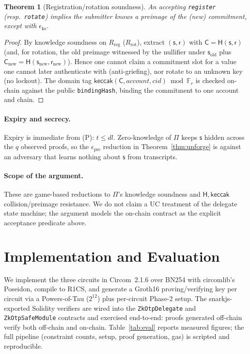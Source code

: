 \documentclass[11pt]{article}
\theoremstyle{definition}
\theoremstyle{plain}
\newtheorem{theorem}{Theorem}
\newcommand{\Hash}{\mathsf{H}}       %
\newcommand{\keccak}{\mathsf{keccak}}
\newcommand{\Fr}{\mathbb{F}_r}       %
\newcommand{\secret}{\mathsf{s}}
\newcommand{\salt}{\mathsf{r}}
\newcommand{\commit}{\mathsf{C}}
\begin{document}
\begin{theorem}[Registration/rotation soundness]
\label{thm:reg}
An accepting \texttt{register} (resp.\ \texttt{rotate}) implies the submitter knows a
preimage of the (new) commitment, except with $\epsilon_{\mathrm{ks}}$.
\end{theorem}
\begin{proof}
By knowledge soundness on $R_{\mathrm{reg}}$ ($R_{\mathrm{rot}}$), extract
$(\secret,\salt)$ with $\commit=\Hash(\secret,\salt)$ (and, for rotation, the old
preimage witnessed by the nullifier under $\secret_{\mathrm{old}}$ plus
$\commit_{\mathrm{new}}=\Hash(\secret_{\mathrm{new}},\salt_{\mathrm{new}})$). Hence one
cannot claim a commitment slot for a value one cannot later authenticate with
(anti-griefing), nor rotate to an unknown key (no lockout). The domain tag
$\keccak(\commit,\mathit{account},\mathit{cid})\bmod \Fr$ is checked on-chain against
the public \texttt{bindingHash}, binding the commitment to one account and chain.
\end{proof}

\paragraph{Expiry and secrecy.} Expiry is immediate from (P): $t\le\mathit{dl}$.
Zero-knowledge of $\Pi$ keeps $\secret$ hidden across the $q$ observed proofs, so the
$\epsilon_{\mathrm{pre}}$ reduction in Theorem~\ref{thm:unforge} is against an
adversary that learns nothing about $\secret$ from transcripts.

\paragraph{Scope of the argument.} These are game-based reductions to $\Pi$'s
knowledge soundness and $\Hash,\keccak$ collision/preimage resistance. We do not claim
a UC treatment of the delegate state machine; the argument models the on-chain
contract as the explicit acceptance predicate above.

\section{Implementation and Evaluation}
\label{sec:eval}
We implement the three circuits in Circom~2.1.6 over BN254 with circomlib's Poseidon,
compile to R1CS, and generate a Groth16 proving/verifying key per circuit via a
Powers-of-Tau ($2^{12}$) plus per-circuit Phase-2 setup. The snarkjs-exported
Solidity verifiers are wired into the \texttt{ZkOtpDelegate} and
\texttt{ZkOtpSafeModule} contracts and exercised end-to-end: proofs generated
off-chain verify both off-chain and on-chain. Table~\ref{tab:eval} reports measured
figures; the full pipeline (constraint counts, setup, proof generation, gas) is
scripted and reproducible.
\end{document}
